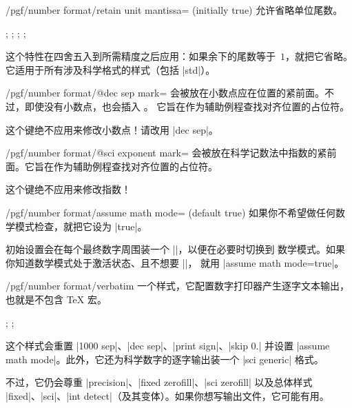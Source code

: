 \documentclass[a4paper,doc2]{ltxdoc}
\begin{document}
\begin{key}{/pgf/number format/retain unit mantissa= (initially true)}
    允许省略单位尾数。
\begin{codeexample}[]
;
;
;
;
\end{codeexample}
    这个特性在四舍五入到所需精度之后应用：如果余下的尾数等于~$1$，就把它省略。
    它适用于所有涉及科学格式的样式（包括 |std|）。
\end{key}

\begin{key}{/pgf/number format/@dec sep mark=}
    会被放在小数点应在位置的紧前面。不过，即使没有小数点，也会插入 。
    它旨在作为辅助例程查找对齐位置的占位符。

    这个键绝不应用来修改小数点！请改用 |dec sep|。
\end{key}

\begin{key}{/pgf/number format/@sci exponent mark=}
    会被放在科学记数法中指数的紧前面。它旨在作为辅助例程查找对齐位置的占位符。

    这个键绝不应用来修改指数！
\end{key}

\begin{key}{/pgf/number format/assume math mode= (default true)}
    如果你不希望做任何数学模式检查，就把它设为 |true|。

    初始设置会在每个最终数字周围装一个 |\pgfutilensuremath|，以便在必要时切换到
    数学模式。如果你知道数学模式处于激活状态、且不想要 |\pgfutilensuremath|，
    就用 |assume math mode=true|。
\end{key}

\begin{stylekey}{/pgf/number format/verbatim}
    一个样式，它配置数字打印器产生逐字文本输出，也就是不包含 \TeX{} 宏。
\begin{codeexample}[]
;
;
\pgfmathprintnumber{\pgfmathresult}
\end{codeexample}
    这个样式会重置 |1000 sep|、|dec sep|、|print sign|、|skip 0.| 并设置
    |assume math mode|。此外，它还为科学数字的逐字输出装一个 |sci generic| 格式。

    不过，它仍会尊重 |precision|、|fixed zerofill|、|sci zerofill| 以及总体样式
    |fixed|、|sci|、|int detect|（及其变体）。如果你想写输出文件，它可能有用。
\end{stylekey}
\end{document}
